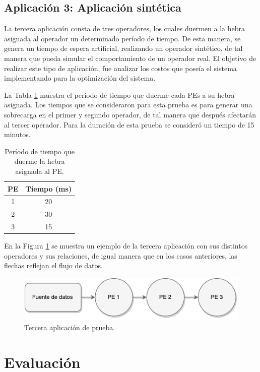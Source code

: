 \subsection{Aplicación 3: Aplicación sintética}
La tercera aplicación consta de tres operadores, los cuales duermen a la hebra asignada al operador un determinado período de tiempo. De esta manera, se genera un tiempo de espera artificial, realizando un operador sintético, de tal manera que pueda simular el comportamiento de un operador real. El objetivo de realizar este tipo de aplicación, fue analizar los costos que poseía el sistema implementando para la optimización del sistema.

La Tabla \ref{tab:app3-time} muestra el período de tiempo que duerme cada PEs a su hebra asignada. Los tiempos que se consideraron para esta prueba es para generar una sobrecarga en el primer y segundo operador, de tal manera que después afectarán al tercer operador. Para la duración de esta prueba se consideró un tiempo de 15 minutos.

\begin{table}[!ht]
\centering
\caption{Período de tiempo que duerme la hebra asignada al PE.}
\begin{tabular}{| c | c |}
\hline
PE & Tiempo (ms) \\ \hline
1 & 20 \\
2 & 30 \\
3 & 15 \\\hline
\end{tabular}
\label{tab:app3-time}
\end{table}

En la Figura \ref{fig:terceraAplicacion} se muestra un ejemplo de la tercera aplicación con sus distintos operadores y sus relaciones, de igual manera que en los casos anteriores, las flechas reflejan el flujo de datos.

\begin{figure}[!hb]
	\centering
		\includegraphics[scale=0.75]{images/App3.pdf}
	\caption{Tercera aplicación de prueba.}
	\label{fig:terceraAplicacion}
\end{figure}

\section{Evaluación}

